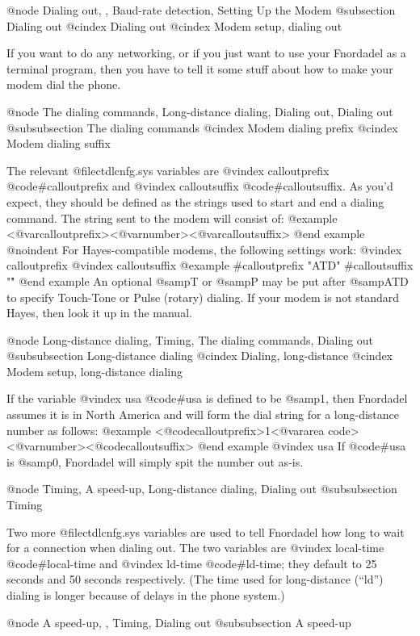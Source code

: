 {{@node Dialing out,  , Baud-rate detection, Setting Up the Modem
@subsection Dialing out
@cindex Dialing out
@cindex Modem setup, dialing out

If you want to do any networking, or if you just
want to use your Fnordadel as a terminal program, then
you have to tell it some stuff about how to make your
modem dial the phone.

@node The dialing commands, Long-distance dialing, Dialing out, Dialing out
@subsubsection The dialing commands
@cindex Modem dialing prefix
@cindex Modem dialing suffix

The relevant @file{ctdlcnfg.sys} variables are
@vindex calloutprefix
@code{#calloutprefix} and
@vindex calloutsuffix
@code{#calloutsuffix}.  As you'd
expect, they should be defined as the strings used
to start and end a dialing command.  The string
sent to the modem will consist of:
@example
<@var{calloutprefix}><@var{number}><@var{calloutsuffix}>
@end example
@noindent
For Hayes-compatible modems, the following
settings work:
@vindex calloutprefix
@vindex calloutsuffix
@example
#calloutprefix "ATD"
#calloutsuffix "\r"
@end example
An optional @samp{T} or @samp{P} may be put after @samp{ATD} to
specify Touch-Tone or Pulse (rotary) dialing.
If your modem is not standard Hayes, then look it
up in the manual.

@node Long-distance dialing, Timing, The dialing commands, Dialing out
@subsubsection Long-distance dialing
@cindex Dialing, long-distance
@cindex Modem setup, long-distance dialing

If the variable
@vindex usa
@code{#usa} is defined to be
@samp{1}, then Fnordadel assumes it is in North
America and will form the dial string for a
long-distance number as follows:
@example
<@code{calloutprefix}>1<@var{area code}><@var{number}><@code{calloutsuffix}>
@end example
@vindex usa
If @code{#usa} is @samp{0}, Fnordadel will simply
spit the number out as-is.

@node Timing, A speed-up, Long-distance dialing, Dialing out
@subsubsection Timing

Two more @file{ctdlcnfg.sys} variables are used
to tell Fnordadel how long to wait for a
connection when dialing out.  The two variables are
@vindex local-time
@code{#local-time} and
@vindex ld-time
@code{#ld-time}; they default to
25 seconds and 50 seconds respectively.  (The time
used for long-distance (``ld'') dialing is longer
because of delays in the phone system.)

@node A speed-up,  , Timing, Dialing out
@subsubsection A speed-up

}}
